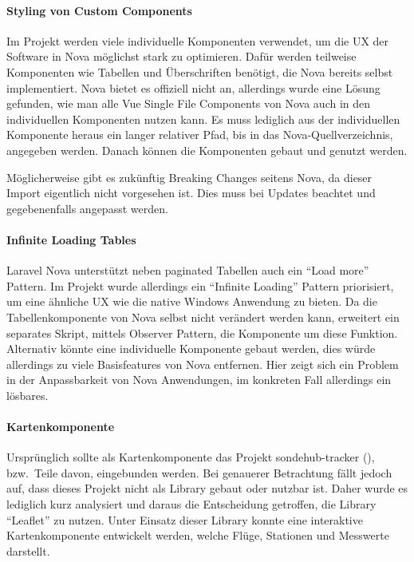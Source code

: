 \paragraph{Styling von Custom Components}
Im Projekt werden viele individuelle Komponenten verwendet, um die UX der Software in Nova möglichst stark zu optimieren.
Dafür werden teilweise Komponenten wie Tabellen und Überschriften benötigt, die Nova bereits selbst implementiert.
Nova bietet es offiziell nicht an, allerdings wurde eine Lösung gefunden, wie man alle Vue Single File Components von Nova auch in den individuellen Komponenten nutzen kann.
Es muss lediglich aus der individuellen Komponente heraus ein langer relativer Pfad, bis in das Nova-Quellverzeichnis, angegeben werden.
Danach können die Komponenten gebaut und genutzt werden.

Möglicherweise gibt es zukünftig Breaking Changes seitens Nova, da dieser Import eigentlich nicht vorgesehen ist.
Dies muss bei Updates beachtet und gegebenenfalls angepasst werden.

\paragraph{Infinite Loading Tables}
Laravel Nova unterstützt neben paginated Tabellen auch ein \enquote{Load more} Pattern.
Im Projekt wurde allerdings ein \enquote{Infinite Loading} Pattern priorisiert, um eine ähnliche UX wie die native Windows Anwendung zu bieten.
Da die Tabellenkomponente von Nova selbst nicht verändert werden kann, erweitert ein separates Skript, mittels Observer Pattern, die Komponente um diese Funktion.
Alternativ könnte eine individuelle Komponente gebaut werden, dies würde allerdings zu viele Basisfeatures von Nova entfernen.
Hier zeigt sich ein Problem in der Anpassbarkeit von Nova Anwendungen, im konkreten Fall allerdings ein lösbares.

\paragraph{Kartenkomponente}
Ursprünglich sollte als Kartenkomponente das Projekt sondehub-tracker (\cite{sondehub-tracker}), bzw.\ Teile davon, eingebunden werden.
Bei genauerer Betrachtung fällt jedoch auf, dass dieses Projekt nicht als Library gebaut oder nutzbar ist.
Daher wurde es lediglich kurz analysiert und daraus die Entscheidung getroffen, die Library \enquote{Leaflet} zu nutzen.
Unter Einsatz dieser Library konnte eine interaktive Kartenkomponente entwickelt werden, welche Flüge, Stationen und Messwerte darstellt.

